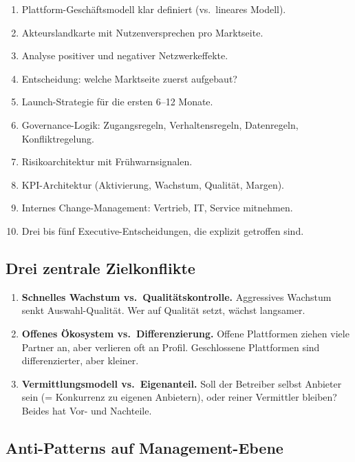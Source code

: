 \documentclass[11pt,a4paper,oneside]{article}
\begin{document}
\begin{enumerate}
  \item Plattform-Geschäftsmodell klar definiert (vs.\ lineares Modell).
  \item Akteurslandkarte mit Nutzenversprechen pro Marktseite.
  \item Analyse positiver und negativer Netzwerkeffekte.
  \item Entscheidung: welche Marktseite zuerst aufgebaut?
  \item Launch-Strategie für die ersten 6--12 Monate.
  \item Governance-Logik: Zugangsregeln, Verhaltensregeln, Datenregeln, Konfliktregelung.
  \item Risikoarchitektur mit Frühwarnsignalen.
  \item KPI-Architektur (Aktivierung, Wachstum, Qualität, Margen).
  \item Internes Change-Management: Vertrieb, IT, Service mitnehmen.
  \item Drei bis fünf Executive-Entscheidungen, die explizit getroffen sind.
\end{enumerate}

\subsection{Drei zentrale Zielkonflikte}

\begin{enumerate}
  \item \textbf{Schnelles Wachstum vs.\ Qualitätskontrolle.} Aggressives Wachstum senkt Auswahl-Qualität. Wer auf Qualität setzt, wächst langsamer.
  \item \textbf{Offenes Ökosystem vs.\ Differenzierung.} Offene Plattformen ziehen viele Partner an, aber verlieren oft an Profil. Geschlossene Plattformen sind differenzierter, aber kleiner.
  \item \textbf{Vermittlungsmodell vs.\ Eigenanteil.} Soll der Betreiber selbst Anbieter sein (= Konkurrenz zu eigenen Anbietern), oder reiner Vermittler bleiben? Beides hat Vor- und Nachteile.
\end{enumerate}

\subsection{Anti-Patterns auf Management-Ebene}
\end{document}
